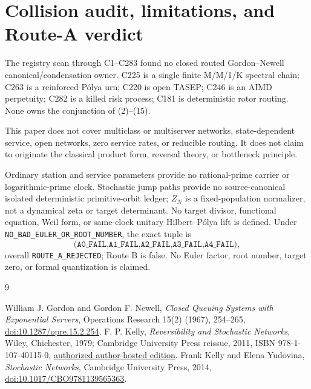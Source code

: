 \documentclass[10pt]{article}
\begin{document}
\section{Collision audit, limitations, and Route-A verdict}
The registry scan through C1--C283 found no closed routed Gordon--Newell
canonical/condensation owner.  C225 is a single finite M/M/1/K spectral chain;
C263 is a reinforced P\'olya urn; C220 is open TASEP; C246 is an AIMD
perpetuity; C282 is a killed risk process; C181 is deterministic rotor
routing.  None owns the conjunction of (2)--(15).

This paper does not cover multiclass or multiserver networks,
state-dependent service, open networks, zero service rates, or reducible
routing.  It does not claim to originate the classical product form,
reversal theory, or bottleneck principle.

Ordinary station and service parameters provide no rational-prime carrier or
logarithmic-prime clock.  Stochastic jump paths provide no source-canonical
isolated deterministic primitive-orbit ledger; $Z_N$ is a fixed-population
normalizer, not a dynamical zeta or target determinant.  No target divisor,
functional equation, Weil form, or same-clock unitary Hilbert--P\'olya lift is
defined.  Under \texttt{NO\_BAD\_EULER\_OR\_ROOT\_NUMBER}, the exact tuple is
\[
 \texttt{(A0\_FAIL,A1\_FAIL,A2\_FAIL,A3\_FAIL,A4\_FAIL)},
\]
overall \texttt{ROUTE\_A\_REJECTED}; Route B is false.  No Euler factor,
root number, target zero, or formal quantization is claimed.
\fi

\begin{thebibliography}{9}
\raggedright
{} William J. Gordon and Gordon F. Newell,
\emph{Closed Queuing Systems with Exponential Servers},
Operations Research 15(2) (1967), 254--265,
\href{https://doi.org/10.1287/opre.15.2.254}{doi:10.1287/opre.15.2.254}.
 F. P. Kelly,
\emph{Reversibility and Stochastic Networks}, Wiley, Chichester, 1979;
Cambridge University Press reissue, 2011, ISBN 978-1-107-40115-0,
\href{https://www.statslab.cam.ac.uk/~fpk1/BOOKS/kelly_book.html}{authorized author-hosted edition}.
 Frank Kelly and Elena Yudovina,
\emph{Stochastic Networks}, Cambridge University Press, 2014,
\href{https://doi.org/10.1017/CBO9781139565363}{doi:10.1017/CBO9781139565363}.
\end{thebibliography}
\end{document}
